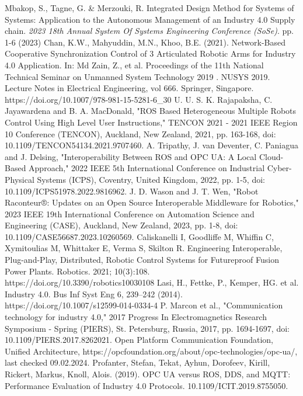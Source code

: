 \documentclass[conference]{IEEEtran}
\begin{document}
\begin{thebibliography}{00}
	Mbakop, S., Tagne, G. \& Merzouki, R. Integrated Design Method for Systems of Systems: Application to the Autonomous Management of an Industry 4.0 Supply chain. {\em 2023 18th Annual System Of Systems Engineering Conference (SoSe)}. pp. 1-6 (2023)
Chan, K.W., Mahyuddin, M.N., Khoo, B.E. (2021). Network-Based Cooperative Synchronization Control of 3 Articulated Robotic Arms for Industry 4.0 Application. In: Md Zain, Z., et al. Proceedings of the 11th National Technical Seminar on Unmanned System Technology 2019 . NUSYS 2019. Lecture Notes in Electrical Engineering, vol 666. Springer, Singapore. https://doi.org/10.1007/978-981-15-5281-6\_30
U. U. S. K. Rajapaksha, C. Jayawardena and B. A. MacDonald, "ROS Based Heterogeneous Multiple Robots Control Using High Level User Instructions," TENCON 2021 - 2021 IEEE Region 10 Conference (TENCON), Auckland, New Zealand, 2021, pp. 163-168, doi: 10.1109/TENCON54134.2021.9707460.
A. Tripathy, J. van Deventer, C. Paniagua and J. Delsing, "Interoperability Between ROS and OPC UA: A Local Cloud-Based Approach," 2022 IEEE 5th International Conference on Industrial Cyber-Physical Systems (ICPS), Coventry, United Kingdom, 2022, pp. 1-5, doi: 10.1109/ICPS51978.2022.9816962.
J. D. Wason and J. T. Wen, "Robot Raconteur®: Updates on an Open Source Interoperable Middleware for Robotics," 2023 IEEE 19th International Conference on Automation Science and Engineering (CASE), Auckland, New Zealand, 2023, pp. 1-8, doi: 10.1109/CASE56687.2023.10260569.
Caliskanelli I, Goodliffe M, Whiffin C, Xymitoulias M, Whittaker E, Verma S, Skilton R. Engineering Interoperable, Plug-and-Play, Distributed, Robotic Control Systems for Futureproof Fusion Power Plants. Robotics. 2021; 10(3):108. https://doi.org/10.3390/robotics10030108
Lasi, H., Fettke, P., Kemper, HG. et al. Industry 4.0. Bus Inf Syst Eng 6, 239–242 (2014). https://doi.org/10.1007/s12599-014-0334-4
 P. Marcon et al., "Communication technology for industry 4.0," 2017 Progress In Electromagnetics Research Symposium - Spring (PIERS), St. Petersburg, Russia, 2017, pp. 1694-1697, doi: 10.1109/PIERS.2017.8262021.
Open Platform Communication Foundation, Unified Architecture, https://opcfoundation.org/about/opc-technologies/opc-ua/, last checked 09.02.2024.
 Profanter, Stefan, Tekat, Ayhun, Dorofeev, Kirill, Rickert, Markus, Knoll, Alois. (2019). OPC UA versus ROS, DDS, and MQTT: Performance Evaluation of Industry 4.0 Protocols. 10.1109/ICIT.2019.8755050. 

\end{thebibliography}
\end{document}
